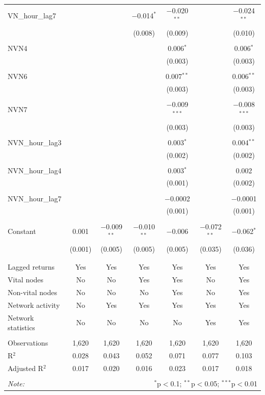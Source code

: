 \begin{table}[!htbp]
\begin{tabular}{@{\extracolsep{5pt}}lcccccc}
 VN\_hour\_lag7 &  &  & $-$0.014$^{*}$ & $-$0.020$^{**}$ &  & $-$0.024$^{**}$ \\ 
  &  &  & (0.008) & (0.009) &  & (0.010) \\ 
  & & & & & & \\ 
 NVN4 &  &  &  & 0.006$^{*}$ &  & 0.006$^{*}$ \\ 
  &  &  &  & (0.003) &  & (0.003) \\ 
  & & & & & & \\ 
 NVN6 &  &  &  & 0.007$^{**}$ &  & 0.006$^{**}$ \\ 
  &  &  &  & (0.003) &  & (0.003) \\ 
  & & & & & & \\ 
 NVN7 &  &  &  & $-$0.009$^{***}$ &  & $-$0.008$^{***}$ \\ 
  &  &  &  & (0.003) &  & (0.003) \\ 
  & & & & & & \\ 
 NVN\_hour\_lag3 &  &  &  & 0.003$^{*}$ &  & 0.004$^{**}$ \\ 
  &  &  &  & (0.002) &  & (0.002) \\ 
  & & & & & & \\ 
 NVN\_hour\_lag4 &  &  &  & 0.003$^{*}$ &  & 0.002 \\ 
  &  &  &  & (0.001) &  & (0.002) \\ 
  & & & & & & \\ 
 NVN\_hour\_lag7 &  &  &  & $-$0.0002 &  & $-$0.0001 \\ 
  &  &  &  & (0.001) &  & (0.001) \\ 
  & & & & & & \\ 
 Constant & 0.001 & $-$0.009$^{**}$ & $-$0.010$^{**}$ & $-$0.006 & $-$0.072$^{**}$ & $-$0.062$^{*}$ \\ 
  & (0.001) & (0.005) & (0.005) & (0.005) & (0.035) & (0.036) \\ 
  & & & & & & \\ 
\hline \\[-1.8ex] 
Lagged returns & Yes & Yes & Yes & Yes & Yes & Yes \\ 
Vital nodes & No & No & Yes & Yes & No & Yes \\ 
Non-vital nodes & No & No & No & Yes & No & Yes \\ 
Network activity & No & Yes & Yes & Yes & Yes & Yes \\ 
Network statistics & No & No & No & No & Yes & Yes \\ 
\hline &  &  &  &  &  &  \\ 
Observations & 1,620 & 1,620 & 1,620 & 1,620 & 1,620 & 1,620 \\ 
R$^{2}$ & 0.028 & 0.043 & 0.052 & 0.071 & 0.077 & 0.103 \\ 
Adjusted R$^{2}$ & 0.017 & 0.020 & 0.016 & 0.023 & 0.017 & 0.018 \\ 
\hline 
\hline \\[-1.8ex] 
\textit{Note:}  & \multicolumn{6}{r}{$^{*}$p$<$0.1; $^{**}$p$<$0.05; $^{***}$p$<$0.01} \\ 
\end{tabular} 
\end{table} 
